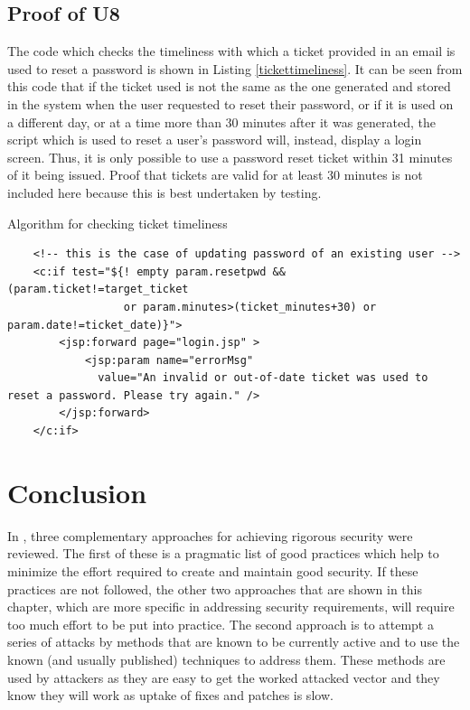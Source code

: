 \subsection{Proof of U8}
The code which checks the timeliness with which a ticket provided in an email is used to reset a password is shown in Listing \ref{tickettimeliness}. It can be seen from this code that if the ticket used is not the same as the one generated and stored in the system when the user requested to reset their password, or if it is used on a different day, or at a time more than 30 minutes after it was generated, the script which is used to reset a user's password will, instead, display a login screen. Thus, it is only possible to use a password reset ticket within 31 minutes of it being issued. Proof that tickets are valid for at least 30 minutes is not included here because this is best undertaken by testing.
\begin{listing}
\caption{Algorithm for checking ticket timeliness}\label{tickettimeliness}
{\footnotesize
\vspace{5mm}
\begin{verbatim}
    <!-- this is the case of updating password of an existing user -->
    <c:if test="${! empty param.resetpwd && (param.ticket!=target_ticket 
                  or param.minutes>(ticket_minutes+30) or param.date!=ticket_date)}">
        <jsp:forward page="login.jsp" >
            <jsp:param name="errorMsg"
              value="An invalid or out-of-date ticket was used to reset a password. Please try again." />
        </jsp:forward>        
    </c:if>		
\end{verbatim}
}
\end{listing}

\section{Conclusion}\label{concl}

In \cite{sheniar2018experiments}, three complementary approaches for achieving rigorous security were reviewed. The first of these is a pragmatic list of good practices which help to minimize the effort required to create and maintain good security. If these practices are not followed, the other two approaches that are shown in this chapter, which are more specific in addressing security requirements, will require too much effort to be put into practice. The second approach is to attempt a series of attacks by methods that are known to be currently active and to use the known (and usually published) techniques to address them. These methods are used by attackers as they are easy to get the worked attacked vector and they know they will work as uptake of fixes and patches is slow. 

